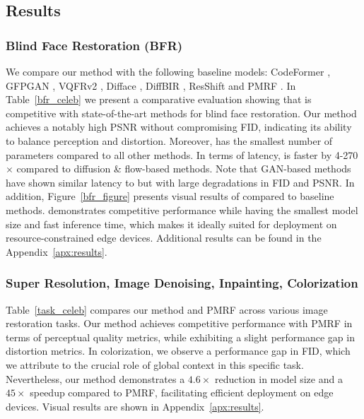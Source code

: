 \subsection{Results}
\subsubsection{Blind Face Restoration (BFR)}\label{bfr_result}
We compare our method with the following baseline models: CodeFormer \cite{zhou2022codeformer}, GFPGAN \cite{wang2021gfpgan}, VQFRv2 \cite{gu2022vqfr}, Difface \cite{yue2024difface}, DiffBIR \cite{lin2023diffbir}, ResShift \cite{10681246} and PMRF \cite{ohayon2024posterior}. In Table~\ref{bfr_celeb} we present a comparative evaluation showing that \name is competitive with state-of-the-art methods for blind face restoration. Our method achieves a notably high PSNR without compromising FID, indicating its ability to balance perception and distortion. Moreover, \name has the smallest number of parameters compared to all other methods. In terms of latency, \name is faster by 4-270$\times$ compared to diffusion \& flow-based methods. Note that GAN-based methods have shown similar latency to \name but with large degradations in FID and PSNR. In addition, Figure~\ref{bfr_figure} presents visual results of \name compared to baseline methods. \name demonstrates competitive performance while having the smallest model size and fast inference time, which makes it ideally suited for deployment on resource-constrained edge devices. Additional results can be found in the Appendix~\ref{apx:results}.

\subsubsection{Super Resolution, Image Denoising, Inpainting, Colorization}\label{tasks_result}
Table~\ref{task_celeb} compares our method and PMRF \cite{ohayon2024posterior} across various image restoration tasks. Our method achieves competitive performance with PMRF in terms of perceptual quality metrics, while exhibiting a slight performance gap in distortion metrics. In colorization, we observe a performance gap in FID, which we attribute to the crucial role of global context in this specific task. Nevertheless, our method demonstrates a $4.6\times$ reduction in model size and a $45\times$ speedup compared to PMRF, facilitating efficient deployment on edge devices. Visual results are shown in Appendix~\ref{apx:results}.










